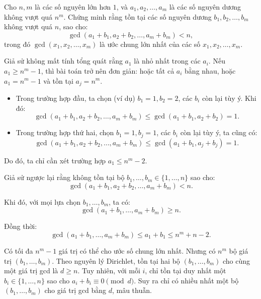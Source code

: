 \ifshowproblemandsoln
\ifshowproblem\begin{problem}\label{problem:EGMO-2015-P3}\fi
\ifshowsoln\begin{problem}\fi
    Cho \( n, m \) là các số nguyên lớn hơn \( 1 \), và \( a_1, a_2, \dots, a_m \) là các số nguyên dương không vượt quá \( n^m \).  
    Chứng minh rằng tồn tại các số nguyên dương \( b_1, b_2, \dots, b_m \) không vượt quá \( n \), sao cho:
    \[
        \gcd(a_1 + b_1, a_2 + b_2, \dots, a_m + b_m) < n,
    \]
    trong đó \( \gcd(x_1, x_2, \dots, x_m) \) là ước chung lớn nhất của các số \( x_1, x_2, \dots, x_m \).
\end{problem}
\fi

\ifshowsoln
\begin{soln}\footnotemark
    Giả sử không mất tính tổng quát rằng \( a_1 \) là nhỏ nhất trong các \( a_i \).
    Nếu \( a_1 \ge n^m - 1 \), thì bài toán trở nên đơn giản: hoặc tất cả \( a_i \) bằng nhau, hoặc \( a_1 = n^m - 1 \) và tồn tại \( a_j = n^m \).

    \begin{itemize}[topsep=0pt, partopsep=0pt, itemsep=0pt]
        \item Trong trường hợp đầu, ta chọn (ví dụ) \( b_1 = 1, b_2 = 2 \), các \( b_i \) còn lại tùy ý. Khi đó:
        \[
            \gcd(a_1 + b_1, a_2 + b_2, \ldots, a_m + b_m) \le \gcd(a_1 + b_1, a_2 + b_2) = 1.
        \]
        \item Trong trường hợp thứ hai, chọn \( b_1 = 1, b_j = 1 \), các \( b_i \) còn lại tùy ý, ta cũng có:
        \[
            \gcd(a_1 + b_1, a_2 + b_2, \ldots, a_m + b_m) \le \gcd(a_1 + b_1, a_j + b_j) = 1.
        \]
    \end{itemize}

    Do đó, ta chỉ cần xét trường hợp \( a_1 \le n^m - 2 \).

    Giả sử ngược lại rằng không tồn tại bộ \( b_1, \ldots, b_m \in \{1, \ldots, n\} \) sao cho:
    \[
        \gcd(a_1 + b_1, a_2 + b_2, \ldots, a_m + b_m) < n.
    \]

    Khi đó, với mọi lựa chọn \( b_1, \ldots, b_m \), ta có:
    \[
        \gcd(a_1 + b_1, \ldots, a_m + b_m) \ge n.
    \]

    Đồng thời:
    \[
        \gcd(a_1 + b_1, \ldots, a_m + b_m) \le a_1 + b_1 \le n^m + n - 2.
    \]

    Có tối đa \( n^m - 1 \) giá trị có thể cho ước số chung lớn nhất. Nhưng có \( n^m \) bộ giá trị \( (b_1, \ldots, b_m) \).
    Theo nguyên lý Dirichlet, tồn tại hai bộ \( (b_1, \ldots, b_m) \) cho cùng một giá trị gcd là \( d \ge n \).
    Tuy nhiên, với mỗi \( i \), chỉ tồn tại duy nhất một \( b_i \in \{1, \ldots, n\} \) sao cho \( a_i + b_i \equiv 0 \pmod{d} \).
    Suy ra chỉ có nhiều nhất một bộ \( (b_1, \ldots, b_m) \) cho giá trị gcd bằng \( d \), mâu thuẫn.
\end{soln}


\end{problem}
